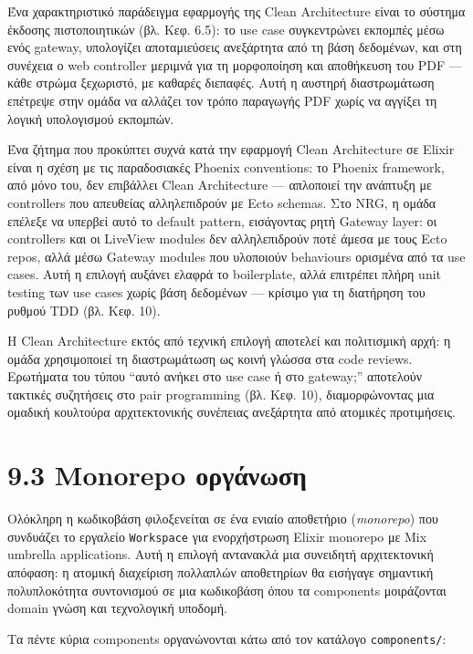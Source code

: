 Ένα χαρακτηριστικό παράδειγμα εφαρμογής της Clean Architecture είναι το
σύστημα έκδοσης πιστοποιητικών (βλ. Κεφ. 6.5): το use case συγκεντρώνει
εκπομπές μέσω ενός gateway, υπολογίζει αποταμιεύσεις ανεξάρτητα από τη
βάση δεδομένων, και στη συνέχεια ο web controller μεριμνά για τη
μορφοποίηση και αποθήκευση του PDF --- κάθε στρώμα ξεχωριστό, με καθαρές
διεπαφές. Αυτή η αυστηρή διαστρωμάτωση επέτρεψε στην ομάδα να αλλάζει
τον τρόπο παραγωγής PDF χωρίς να αγγίξει τη λογική υπολογισμού εκπομπών.

Ένα ζήτημα που προκύπτει συχνά κατά την εφαρμογή Clean Architecture σε
Elixir είναι η σχέση με τις παραδοσιακές Phoenix conventions: το Phoenix
framework, από μόνο του, δεν επιβάλλει Clean Architecture --- απλοποιεί
την ανάπτυξη με controllers που απευθείας αλληλεπιδρούν με Ecto schemas.
Στο NRG, η ομάδα επέλεξε να υπερβεί αυτό το default pattern, εισάγοντας
ρητή Gateway layer: οι controllers και οι LiveView modules δεν
αλληλεπιδρούν ποτέ άμεσα με τους Ecto repos, αλλά μέσω Gateway modules
που υλοποιούν behaviours ορισμένα από τα use cases. Αυτή η επιλογή
αυξάνει ελαφρά το boilerplate, αλλά επιτρέπει πλήρη unit testing των use
cases χωρίς βάση δεδομένων --- κρίσιμο για τη διατήρηση του ρυθμού TDD
(βλ. Κεφ. 10).

Η Clean Architecture εκτός από τεχνική επιλογή αποτελεί και πολιτισμική
αρχή: η ομάδα χρησιμοποιεί τη διαστρωμάτωση ως κοινή γλώσσα στα code
reviews. Ερωτήματα του τύπου ``αυτό ανήκει στο use case ή στο gateway;''
αποτελούν τακτικές συζητήσεις στο pair programming (βλ. Κεφ. 10),
διαμορφώνοντας μια ομαδική κουλτούρα αρχιτεκτονικής συνέπειας ανεξάρτητα
από ατομικές προτιμήσεις.

\section{9.3 Monorepo
οργάνωση}\label{monorepo-ux3bfux3c1ux3b3ux3acux3bdux3c9ux3c3ux3b7}

Ολόκληρη η κωδικοβάση φιλοξενείται σε ένα ενιαίο αποθετήριο
(\emph{monorepo}) που συνδυάζει το εργαλείο \texttt{Workspace} για
ενορχήστρωση Elixir monorepo με Mix umbrella applications. Αυτή η
επιλογή αντανακλά μια συνειδητή αρχιτεκτονική απόφαση: η ατομική
διαχείριση πολλαπλών αποθετηρίων θα εισήγαγε σημαντική πολυπλοκότητα
συντονισμού σε μια κωδικοβάση όπου τα components μοιράζονται domain
γνώση και τεχνολογική υποδομή.

Τα πέντε κύρια components οργανώνονται κάτω από τον κατάλογο
\texttt{components/}:

